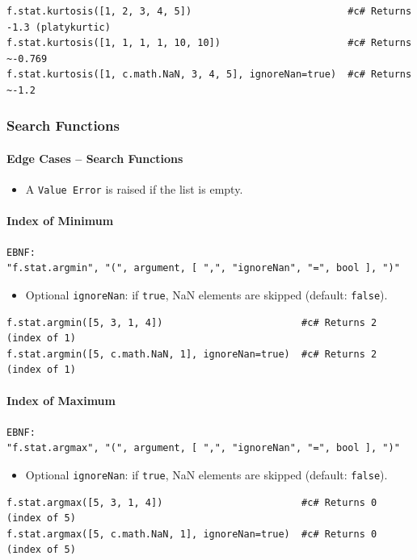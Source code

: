 \begin{verbatim}
f.stat.kurtosis([1, 2, 3, 4, 5])                           #c# Returns -1.3 (platykurtic)
f.stat.kurtosis([1, 1, 1, 1, 10, 10])                      #c# Returns ~-0.769
f.stat.kurtosis([1, c.math.NaN, 3, 4, 5], ignoreNan=true)  #c# Returns ~-1.2
\end{verbatim}

\subsubsection{Search Functions}

\paragraph{Edge Cases -- Search Functions}
\begin{itemize}
\item A \texttt{Value Error} is raised if the list is empty.
\end{itemize}

\paragraph{Index of Minimum}
\begin{verbatim}
EBNF:
"f.stat.argmin", "(", argument, [ ",", "ignoreNan", "=", bool ], ")"
\end{verbatim}
\begin{itemize}
\item Optional \texttt{ignoreNan}: if \texttt{true}, NaN elements are skipped (default: \texttt{false}).
\end{itemize}
\begin{verbatim}
f.stat.argmin([5, 3, 1, 4])                        #c# Returns 2 (index of 1)
f.stat.argmin([5, c.math.NaN, 1], ignoreNan=true)  #c# Returns 2 (index of 1)
\end{verbatim}

\paragraph{Index of Maximum}
\begin{verbatim}
EBNF:
"f.stat.argmax", "(", argument, [ ",", "ignoreNan", "=", bool ], ")"
\end{verbatim}
\begin{itemize}
\item Optional \texttt{ignoreNan}: if \texttt{true}, NaN elements are skipped (default: \texttt{false}).
\end{itemize}
\begin{verbatim}
f.stat.argmax([5, 3, 1, 4])                        #c# Returns 0 (index of 5)
f.stat.argmax([5, c.math.NaN, 1], ignoreNan=true)  #c# Returns 0 (index of 5)
\end{verbatim}

